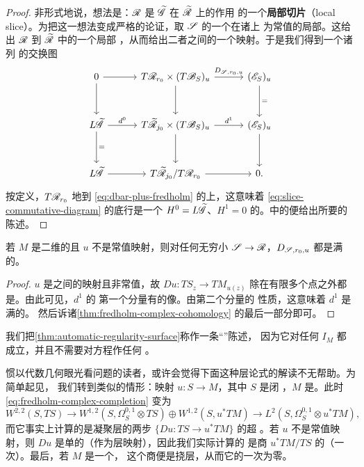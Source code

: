 \begin{proof}
非形式地说，想法是：$\mathscr{R}$ 是 $\widetilde{\mathscr{G}}$ 在 $\widetilde{\mathscr{R}}$ 上的作用%
的一个\textbf{局部切片}（local slice）。为把这一想法变成严格的论证，取 $\mathscr{S}$ 的一个在诸\trStriplikeEnd{}上%
为常值的局部\trTrivialization。这给出 $\mathscr{R}$ 到 $\widetilde{\mathscr{R}}$ 中的一个局部%
\trEmbedding，从而给出二者\trTangentSpace{}之间的一个映射。于是我们得到一个诸列%
\trExact{}的交换图
\begin{equation}\label{eq:slice-commutative-diagram}
\begin{tikzcd}[column sep=1.05cm,row sep=1.05cm]
0\arrow[r]\arrow[d] &
T\scr{R}_{r_0}\times(T\scr{B}_S)_u\arrow[d]\arrow[r,"D_{\scr{S},r_0,u}"] &
(\scr{E}_S)_u\arrow[d,"="] \\
L\widetilde{\scr{G}}\arrow[r,"d^0"]\arrow[d,"="] &
T\widetilde{\scr{R}}_{j_0}\times(T\scr{B}_S)_u\arrow[d]\arrow[r,"d^1"] &
(\scr{E}_S)_u\arrow[d] \\
L\widetilde{\scr{G}}\arrow[r] &
T\widetilde{\scr{R}}_{j_0}/T\scr{R}_{r_0}\arrow[r] &
0.
\end{tikzcd}
\end{equation}
按定义，$T\mathscr{R}_{r_0}$ \trIsomorphic{}地\trProjection{}到%
\eqref{eq:dbar-plus-fredholm} 的\trCokernel{}上，这意味着%
\eqref{eq:slice-commutative-diagram} 的底行是一个 $H^0=L\widetilde{\mathscr{G}}$、$H^1=0$%
的\trComplex。\trCohomology{}中的\trLongExactSequence{}便给出所要的陈述。
\end{proof}
\begin{lemma}\label{thm:automatic-regularity-surface}
若 $M$ 是二维的且 $u$ 不是常值映射，则对任何无穷小\trMiniversal{}\trFamily{}
$\mathscr{S}\to\mathscr{R}$，$D_{\mathscr{S},r_0,u}$ 都是满的。
\end{lemma}
\begin{proof}
$u$ 是\trRiemann\trSurface{}之间的\trHolomorphic{}映射且非常值，故%
$Du\colon TS_z\to TM_{u(z)}$ 除在有限多个点之外都是\trIsomorphism。由此可见，$d^1$ 的%
第一个分量有\trDense{}的像。由第二个分量的 \trFredholm{}性质，这意味着 $d^1$ 是满的。%
然后诉诸\cref{thm:fredholm-complex-cohomology} 的最后一部分即可。
\end{proof}
我们把\cref{thm:automatic-regularity-surface}称作一条“\trAutomaticRegularity”陈述，%
因为它对任何 $I_M$ 都成立，并且不需要对\trPseudoholomorphicMap{}方程作任何%
\trPerturbation。
\begin{remark}\label{thm:sheaf-theoretic-interpretation}
惯以代数几何眼光看问题的读者，或许会觉得下面这种层论式的解读不无帮助。为简单起见，%
我们转到类似的情形：\trHolomorphic{}映射 $u\colon S\to M$，其中 $S$ 是闭%
\trRiemann\trSurface，$M$ 是\trComplex\trManifold。此时%
\eqref{eq:fredholm-complex-completion} 变为
\begin{equation*}
W^{2,2}(S,TS)\longrightarrow
W^{1,2}(S,\Omega^{0,1}_S\otimes TS)\oplus W^{1,2}(S,u^*TM)\longrightarrow
L^2(S,\Omega^{0,1}_S\otimes u^*TM),
\end{equation*}
而它事实上计算的是凝聚层的两步\trComplex{} $\{Du\colon TS\to u^*TM\}$ 的超%
\trCohomology。若 $u$ 不是常值映射，则 $Du$ 是单的（作为层映射），因此我们实际计算的%
是商 $u^*TM/TS$ 的\trCohomology（\trSuspension{}一次）。最后，若 $M$ 是一个\trSurface，%
这个商便是挠层，从而它的一次\trCohomology{}为零。
\end{remark}
